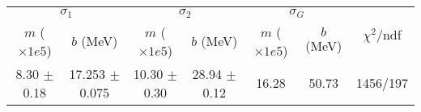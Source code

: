 \begin{tabular}{cc|cc|cc||c}
\multicolumn{2}{c|}{$\sigma_1$} & \multicolumn{2}{|c}{$\sigma_2$} & \multicolumn{2}{|c}{$\sigma_G$}  & \multirow{2}{*}{$\chi^2/$ndf}\\
$m$ ($\times1e5$) & $b$ (MeV) & $m$ ($\times1e5$) & $b$ (MeV) & $m$ ($\times1e5$) & $b$ (MeV) & \\
\hline
8.30 $\pm$ 0.18 & 17.253 $\pm$ 0.075 & 10.30 $\pm$ 0.30 & 28.94 $\pm$ 0.12 & 16.28 & 50.73 & 1456/197\\
\end{tabular}
